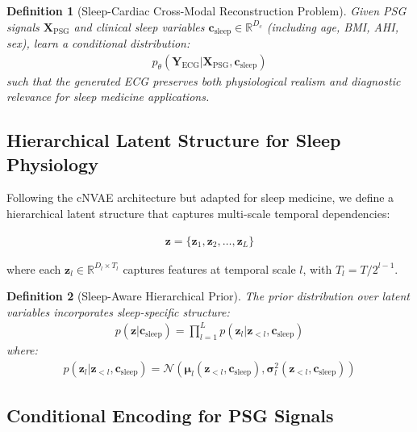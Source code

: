 \documentclass[11pt,en]{elegantpaper}
\newtheorem{definition}{Definition}
\begin{document}
\begin{definition}[Sleep-Cardiac Cross-Modal Reconstruction Problem]
Given PSG signals $\mathbf{X}_{\text{PSG}}$ and clinical sleep variables $\mathbf{c}_{\text{sleep}} \in \mathbb{R}^{D_c}$ (including age, BMI, AHI, sex), learn a conditional distribution:
\begin{align}
p_\theta(\mathbf{Y}_{\text{ECG}} | \mathbf{X}_{\text{PSG}}, \mathbf{c}_{\text{sleep}})
\end{align}
such that the generated ECG preserves both physiological realism and diagnostic relevance for sleep medicine applications.
\end{definition}

\subsection{Hierarchical Latent Structure for Sleep Physiology}

Following the cNVAE architecture but adapted for sleep medicine, we define a hierarchical latent structure that captures multi-scale temporal dependencies:

\begin{align}
\mathbf{z} = \{\mathbf{z}_1, \mathbf{z}_2, \ldots, \mathbf{z}_L\}
\end{align}

where each $\mathbf{z}_l \in \mathbb{R}^{D_l \times T_l}$ captures features at temporal scale $l$, with $T_l = T / 2^{l-1}$.

\begin{definition}[Sleep-Aware Hierarchical Prior]
The prior distribution over latent variables incorporates sleep-specific structure:
\begin{align}
p(\mathbf{z} | \mathbf{c}_{\text{sleep}}) = \prod_{l=1}^L p(\mathbf{z}_l | \mathbf{z}_{<l}, \mathbf{c}_{\text{sleep}})
\end{align}
where:
\begin{align}
p(\mathbf{z}_l | \mathbf{z}_{<l}, \mathbf{c}_{\text{sleep}}) = \mathcal{N}(\boldsymbol{\mu}_l(\mathbf{z}_{<l}, \mathbf{c}_{\text{sleep}}), \boldsymbol{\sigma}_l^2(\mathbf{z}_{<l}, \mathbf{c}_{\text{sleep}}))
\end{align}
\end{definition}

\subsection{Conditional Encoding for PSG Signals}
\end{document}
